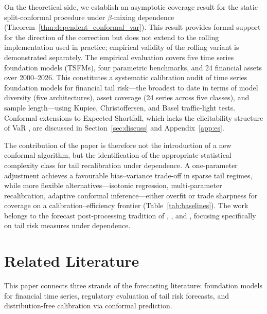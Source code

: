 \documentclass[preprint,11pt,authoryear]{elsarticle}
\newcommand{\1}{\boldsymbol{1}}
\begin{document}
	On the theoretical side, we establish an asymptotic coverage result for the static split-conformal procedure under $\beta$-mixing dependence (Theorem~\ref{thm:dependent_conformal_var}). This result provides formal support for the direction of the correction but does not extend to the rolling implementation used in practice; empirical validity of the rolling variant is demonstrated separately. The empirical evaluation covers five time series foundation models (TSFMs), four parametric benchmarks, and 24 financial assets over 2000--2026. This constitutes a systematic calibration audit of time series foundation models for financial tail risk---the broadest to date in terms of model diversity (five architectures), asset coverage (24 series across five classes), and sample length---using Kupiec, Christoffersen, and Basel traffic-light tests. Conformal extensions to Expected Shortfall, which lacks the elicitability structure of VaR \citep{gneiting2011making}, are discussed in Section~\ref{sec:discuss} and Appendix~\ref{app:es}.

	The contribution of the paper is therefore not the introduction of a new conformal algorithm, but the identification of the appropriate statistical complexity class for tail recalibration under dependence. A one-parameter adjustment achieves a favourable bias--variance trade-off in sparse tail regimes, while more flexible alternatives---isotonic regression, multi-parameter recalibration, adaptive conformal inference---either overfit or trade sharpness for coverage on a calibration--efficiency frontier (Table~\ref{tab:baselines}). The work belongs to the forecast post-processing tradition of \citet{gneiting2013combining}, \citet{brehmer2021properification}, and \citet{taillardat2016calibrated}, focusing specifically on tail risk measures under dependence.

	
	\section{Related Literature}
	\label{sec:lit}
	
	This paper connects three strands of the forecasting literature:
	foundation models for financial time series, regulatory
	evaluation of tail risk forecasts, and distribution-free
	calibration via conformal prediction.
	
\end{document}
